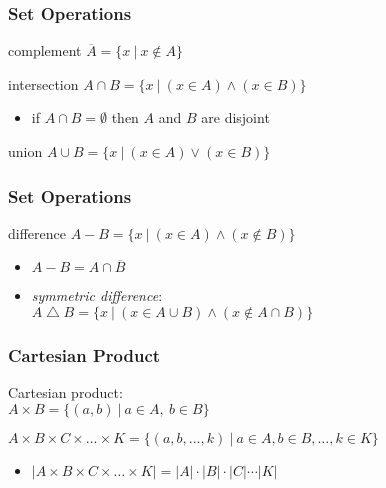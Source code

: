 \documentclass[dvipsnames]{beamer}
\begin{document}
\begin{frame}
  \frametitle{Set Operations}

  \begin{block}{complement}
    $\overline{A} = \{x~|~x \notin A\}$
  \end{block}

  \pause
  \begin{block}{intersection}
    $A \cap B = \{x~|~(x \in A) \wedge (x \in B)\}$

    \begin{itemize}
      \item if $A \cap B = \emptyset$ then $A$ and $B$ are \alert{disjoint}
    \end{itemize}
  \end{block}

  \pause
  \begin{block}{union}
    $A \cup B = \{x~|~(x \in A) \vee (x \in B)\}$
  \end{block}
\end{frame}

\begin{frame}
  \frametitle{Set Operations}

  \begin{block}{difference}
    $A - B = \{x~|~(x \in A) \wedge (x \notin B)\}$

    \begin{itemize}
      \item $A-B = A \cap \overline{B}$
    \end{itemize}
  \end{block}

  \pause
  \begin{itemize}
    \item \emph{symmetric difference}:\\
      $A \bigtriangleup B = \{x~|~(x \in A \cup B) \wedge (x \notin A \cap B)\}$
  \end{itemize}
\end{frame}

\begin{frame}
  \frametitle{Cartesian Product}

  \begin{definition}
    \alert{Cartesian product}:\\
      $A \times B = \{(a, b)~|~a \in A,~b \in B\}$

      \medskip
      $A \times B \times C \times \dots \times K =
        \{(a, b, \ldots, k)~|~a \in A, b \in B, \ldots, k \in K\}$
  \end{definition}

  \medskip
  \begin{itemize}
    \item $|A \times B \times C \times \dots \times K| =
      |A| \cdot |B| \cdot |C| \cdots |K|$
  \end{itemize}
\end{frame}
\end{document}
